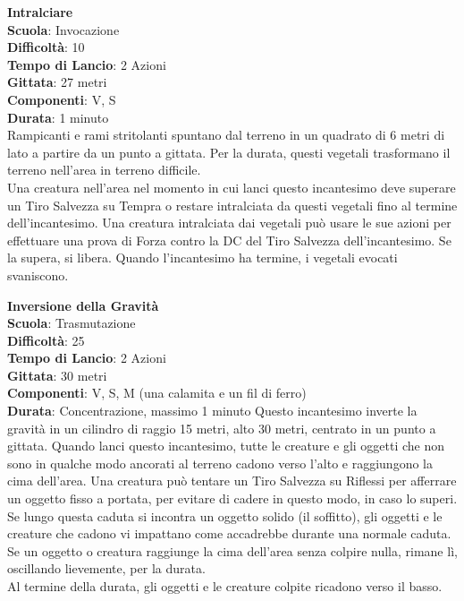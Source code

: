 \begin{multicols}{2}
\medskip\textbf{Intralciare}\\
\textbf{Scuola}: Invocazione\\
\textbf{Difficoltà}:  10\\
\textbf{Tempo di Lancio}: 2 Azioni\\
\textbf{Gittata}: 27 metri\\
\textbf{Componenti}: V, S\\
\textbf{Durata}: 1 minuto\\
Rampicanti e rami stritolanti spuntano dal terreno in un quadrato di 6 metri di lato a partire da un punto a gittata. Per la durata, questi vegetali trasformano il terreno nell'area in terreno difficile.\\
Una creatura nell'area nel momento in cui lanci questo incantesimo deve superare un Tiro Salvezza su Tempra o restare intralciata da questi vegetali fino al termine dell'incantesimo. Una creatura intralciata dai vegetali può usare le sue azioni per effettuare una prova di Forza contro la DC del Tiro Salvezza dell'incantesimo. Se la supera, si libera. Quando l'incantesimo ha termine, i vegetali evocati svaniscono.

\medskip\textbf{Inversione della Gravità}\\
\textbf{Scuola}: Trasmutazione\\
\textbf{Difficoltà}:  25\\
\textbf{Tempo di Lancio}: 2 Azioni\\
\textbf{Gittata}: 30 metri\\
\textbf{Componenti}: V, S, M (una calamita e un fil di ferro)\\
\textbf{Durata}: Concentrazione, massimo 1 minuto 
Questo incantesimo inverte la gravità in un cilindro di raggio 15 metri, alto 30 metri, centrato in un punto a gittata. Quando lanci questo incantesimo, tutte le creature e gli oggetti che non sono in qualche modo ancorati al terreno cadono verso l’alto e raggiungono la cima dell'area. Una creatura può tentare un Tiro Salvezza su Riflessi per afferrare un oggetto fisso a portata, per evitare di cadere in questo modo, in caso lo superi.\\
Se lungo questa caduta si incontra un oggetto solido (il soffitto), gli oggetti e le creature che cadono vi impattano come accadrebbe durante una normale caduta. Se un oggetto o creatura raggiunge la cima dell'area senza colpire nulla, rimane lì, oscillando lievemente, per la durata.\\
Al termine della durata, gli oggetti e le creature colpite ricadono verso il basso.


\end{multicols}
